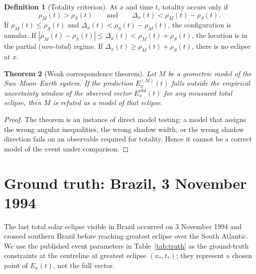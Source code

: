 \documentclass[11pt]{article}
\newtheorem{theorem}{Theorem}[section]
\theoremstyle{definition}
\newtheorem{definition}[theorem]{Definition}
\theoremstyle{remark}
\begin{document}
\begin{definition}[Totality criterion]
At \(x\) and time \(t\), totality occurs only if
\[
\rho_M(t)>\rho_S(t)
\qquad\text{and}\qquad
\Delta_x(t)<\rho_M(t)-\rho_S(t).
\]
If \(\rho_M(t)\le \rho_S(t)\) and
\(\Delta_x(t)<\rho_S(t)-\rho_M(t)\), the configuration is annular.
If \(|\rho_M(t)-\rho_S(t)|\le \Delta_x(t)<\rho_M(t)+\rho_S(t)\), the
location is in the partial (\emph{non-total}) regime.
If \(\Delta_x(t)\ge \rho_M(t)+\rho_S(t)\), there is no eclipse at \(x\).
\end{definition}

\begin{theorem}[Weak correspondence theorem]\label{thm:weak}
Let \(M\) be a geometric model of the Sun--Moon--Earth system. If the
prediction \(E_x^{(M)}(t)\) falls outside the empirical uncertainty window of
the observed vector \(E_x^{\mathrm{obs}}(t)\) for any measured total eclipse,
then \(M\) is refuted as a model of that eclipse.
\end{theorem}

\begin{proof}
The theorem is an instance of direct model testing: a model that assigns the
wrong angular inequalities, the wrong shadow width, or the wrong shadow
direction fails on an observable required for totality. Hence it cannot be a
correct model of the event under comparison.
\end{proof}

\section{Ground truth: Brazil, 3 November 1994}

The last total solar eclipse visible in Brazil occurred on 3 November 1994 and
crossed southern Brazil before reaching greatest eclipse over the South
Atlantic. We use the published event parameters in Table~\ref{tab:truth} as
the ground-truth constraints at the centreline at greatest eclipse
$(x_\ast, t_\ast)$; they represent a chosen point of $E_x(t)$, not
the full vector.
\end{document}

